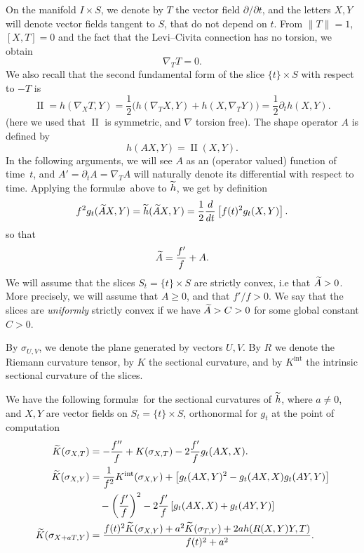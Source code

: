 \documentclass[10pt]{amsart}
\theoremstyle{definition}\newtheorem{defi}[theo]{Definition}\newtheorem{rema}[theo]{Remark}\newtheorem{exam}[theo]{Example}\newtheorem{exem}[theo]{Example}\newtheorem{nota}[theo]{Notation}
\DeclareMathOperator{\II}{II}
\DeclareMathOperator{\intt}{int}
\theoremstyle{plain}
\let\oldtilde\tilde
\renewcommand*{\tilde}[1]{\mathchoice{\widetilde{#1}}{\widetilde{#1}}{\oldtilde{#1}}{\oldtilde{#1}}}
\begin{document}
On the manifold $I\times S$, we denote by $T$ the vector field $\partial/\partial t$, and the letters $X,Y$ will denote vector fields tangent to $S$, that do not depend on $t$. From $\|T\|=1$, $[X,T]=0$ and the fact that the Levi--Civita connection has no torsion, we obtain
\[
\nabla_T T = 0.
\]
We also recall that the second fundamental form of the slice $\{t\}\times S$ with respect to $-T$ is
\[
\II = h(\nabla_X T, Y) =\frac{1}{2}\bigl(h(\nabla_T X, Y) + h(X, \nabla_T Y)\bigr) = \frac{1}{2}\partial_t h(X,Y).
\]
(here we used that $\II$ is symmetric, and $\nabla$ torsion free). The shape operator $A$ is defined by
\[
h(AX,Y) = \II(X,Y).
\]
In the following arguments, we will see $A$ as an (operator valued) function of time~$t$, and $A'=\partial_t A = \nabla_T A$ will naturally denote its differential with respect to time. Applying the formul\ae\ above to $\tilde{h}$, we get by definition
\[
f^2 g_t(\tilde{A} X,Y) = \tilde{h}(\tilde{A}X,Y)= \frac{1}{2} \frac{d}{dt}\left[f(t)^2 g_t(X,Y) \right].
\]
so that
\begin{equation}\label{eq:tildeA}
\tilde{A} = \frac{f'}{f} + A.
\end{equation}
We will assume that the slices $S_t =\{t\} \times S$ are strictly convex, i.e that $\tilde{A} > 0$. More precisely, we will assume that $A\geq 0$, and that $f'/f > 0$. We say that the slices are \emph{uniformly} strictly convex if we have $\tilde{A}> C >0$ for some global constant $C>0$.

By $\sigma_{U,V}$, we denote the plane generated by vectors $U,V$. By $R$ we denote the Riemann curvature tensor, by $K$ the sectional curvature, and by $K^{\intt}$ the intrinsic sectional curvature of the slices.

\begin{prop}\label{prop:gauss-codazzi}
We have the following formul\ae\ for the sectional curvatures of $\tilde{h}$, where $a\neq 0$, and $X,Y$ are vector fields on $S_t=\{t\}\times S$, orthonormal for $g_t$ at the point of computation
\begin{align*}
\tilde{K}(\sigma_{X,T}) &= -\frac{f''}{f} + K(\sigma_{X,T}) - 2 \frac{f'}{f} g_t(AX,X). \\
\tilde{K}(\sigma_{X,Y}) &= \frac{1}{f^2} K^{\intt}(\sigma_{X,Y}) + \left[g_t(AX,Y)^2 - g_t(AX,X)g_t(AY,Y)\right] \\
&\quad - \left(\frac{f'}{f}\right)^2 - 2 \frac{f'}{f}\left[g_t(AX,X)+ g_t(AY,Y)\right]\\
\tilde{K}(\sigma_{X+aT,Y})&= \frac{ f(t)^2 \tilde{K}(\sigma_{X,Y}) + a^2 \tilde{K}(\sigma_{T,Y}) + 2a h(R(X,Y)Y,T)}{f(t)^2 + a^2}.
\end{align*}
\end{prop}
\end{document}

